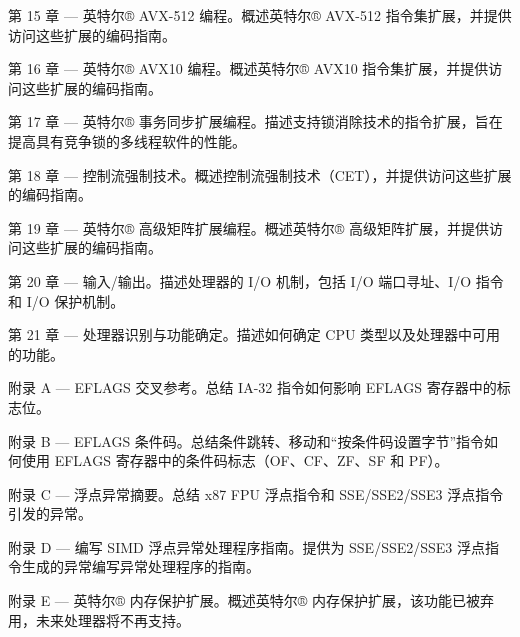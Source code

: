 \documentclass{article}
\begin{document}
第 15 章 — 英特尔® AVX-512 编程。概述英特尔® AVX-512 指令集扩展，并提供访问这些扩展的编码指南。

第 16 章 — 英特尔® AVX10 编程。概述英特尔® AVX10 指令集扩展，并提供访问这些扩展的编码指南。

第 17 章 — 英特尔® 事务同步扩展编程。描述支持锁消除技术的指令扩展，旨在提高具有竞争锁的多线程软件的性能。

第 18 章 — 控制流强制技术。概述控制流强制技术（CET），并提供访问这些扩展的编码指南。

第 19 章 — 英特尔® 高级矩阵扩展编程。概述英特尔® 高级矩阵扩展，并提供访问这些扩展的编码指南。

第 20 章 — 输入/输出。描述处理器的 I/O 机制，包括 I/O 端口寻址、I/O 指令和 I/O 保护机制。

第 21 章 — 处理器识别与功能确定。描述如何确定 CPU 类型以及处理器中可用的功能。

附录 A — EFLAGS 交叉参考。总结 IA-32 指令如何影响 EFLAGS 寄存器中的标志位。

附录 B — EFLAGS 条件码。总结条件跳转、移动和“按条件码设置字节”指令如何使用 EFLAGS 寄存器中的条件码标志（OF、CF、ZF、SF 和 PF）。

附录 C — 浮点异常摘要。总结 x87 FPU 浮点指令和 SSE/SSE2/SSE3 浮点指令引发的异常。

附录 D — 编写 SIMD 浮点异常处理程序指南。提供为 SSE/SSE2/SSE3 浮点指令生成的异常编写异常处理程序的指南。

附录 E — 英特尔® 内存保护扩展。概述英特尔® 内存保护扩展，该功能已被弃用，未来处理器将不再支持。
\end{document}
